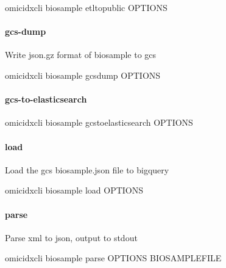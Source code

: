 \documentclass[letterpaper,10pt,english]{sphinxmanual}
\begin{document}
\begin{sphinxVerbatim}[commandchars=\\\{\}]
omicidx\PYGZhy{}cli biosample etl\PYGZhy{}to\PYGZhy{}public \PYG{o}{[}OPTIONS\PYG{o}{]}
\end{sphinxVerbatim}


\paragraph{gcs-dump}
\label{\detokenize{cli:omicidx-cli-biosample-gcs-dump}}
Write json.gz format of biosample to gcs

\begin{sphinxVerbatim}[commandchars=\\\{\}]
omicidx\PYGZhy{}cli biosample gcs\PYGZhy{}dump \PYG{o}{[}OPTIONS\PYG{o}{]}
\end{sphinxVerbatim}


\paragraph{gcs-to-elasticsearch}
\label{\detokenize{cli:omicidx-cli-biosample-gcs-to-elasticsearch}}
\begin{sphinxVerbatim}[commandchars=\\\{\}]
omicidx\PYGZhy{}cli biosample gcs\PYGZhy{}to\PYGZhy{}elasticsearch \PYG{o}{[}OPTIONS\PYG{o}{]}
\end{sphinxVerbatim}


\paragraph{load}
\label{\detokenize{cli:omicidx-cli-biosample-load}}
Load the gcs biosample.json file to bigquery

\begin{sphinxVerbatim}[commandchars=\\\{\}]
omicidx\PYGZhy{}cli biosample load \PYG{o}{[}OPTIONS\PYG{o}{]}
\end{sphinxVerbatim}


\paragraph{parse}
\label{\detokenize{cli:omicidx-cli-biosample-parse}}
Parse xml to json, output to stdout

\begin{sphinxVerbatim}[commandchars=\\\{\}]
omicidx\PYGZhy{}cli biosample parse \PYG{o}{[}OPTIONS\PYG{o}{]} BIOSAMPLE\PYGZus{}FILE
\end{sphinxVerbatim}
\end{document}
